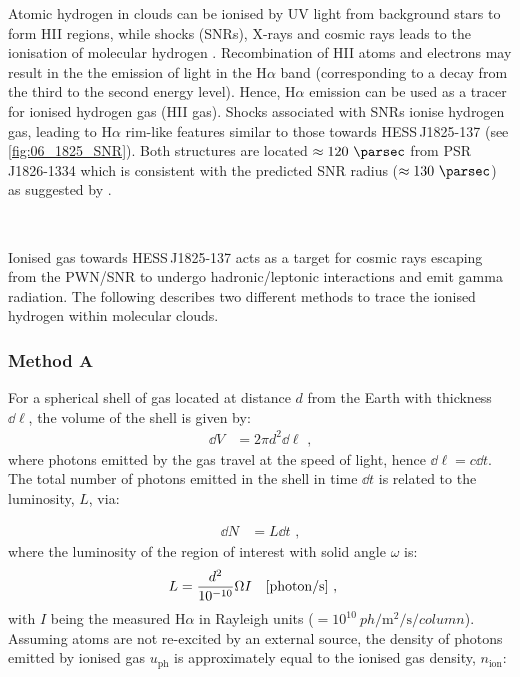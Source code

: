 Atomic hydrogen in clouds can be ionised by UV light from background stars to form HII regions, while shocks (SNRs), X-rays and cosmic rays leads to the ionisation of molecular hydrogen \citep{2011piim.book.....D}. Recombination of HII atoms and electrons may result in the the emission of light in the H$\alpha$ band (corresponding to a decay from the third to the second energy level). Hence, H$\alpha$ emission can be used as a tracer for ionised hydrogen gas (HII gas). Shocks associated with SNRs ionise hydrogen gas, leading to H$\alpha$ rim-like features similar to those towards \mbox{HESS\,J1825-137} (see \autoref{fig:06_1825_SNR}). Both structures are located $\approx 120~\pc$ from \mbox{PSR\,J1826-1334} which is consistent with the predicted SNR radius ($\approx 130~\pc$) as suggested by \cite{deJager2009}.
\par~\par
Ionised gas towards \mbox{HESS\,J1825-137} acts as a target for cosmic rays escaping from the PWN/SNR to undergo hadronic/leptonic interactions and emit gamma radiation. The following describes two different methods to trace the ionised hydrogen within molecular clouds.

\subsubsection{Method A}

For a spherical shell of gas located at distance $d$ from the Earth with thickness $\dd{\ell}$, the volume of the shell is given by:
\begin{equation}
    \begin{aligned}
        \dd{V}&=2\pi d^2 \dd{\ell}\text{ ,}
    \end{aligned}
\end{equation}
\noindent where photons emitted by the gas travel at the speed of light, hence $\dd{\ell}=c\dd{t}$. The total number of photons emitted in the shell in time $\dd{t}$ is related to the luminosity, $L$, via:

\begin{equation}
    \begin{aligned}
        \dd{N}&=L\dd{t}\text{ ,}
    \end{aligned}
\end{equation}
\noindent where the luminosity of the region of interest with solid angle $\omega$ is:
\begin{equation}
    \begin{aligned}
        L&=\frac{d^2}{10^{-10}}\Omega I\quad \qty[\text{photon/s}]\text{ ,}
    \end{aligned}
\end{equation}
\noindent with $I$ being the measured H$\alpha$ in Rayleigh units ($=10^{10}~\si{ph\per\meter\squared\per\second\per{column}}$). Assuming atoms are not re-excited by an external source, the density of photons emitted by ionised gas $u_\text{ph}$ is approximately equal to the ionised gas density, $n_\text{ion}$:

